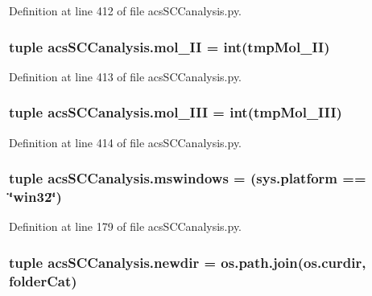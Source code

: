 Definition at line 412 of file acs\-S\-C\-Canalysis.\-py.

\hypertarget{a00096_a8f2878f5909e4aeb9155a1103eaba413}{
\subsubsection[{mol\-\_\-\-I\-I}]{\setlength{\rightskip}{0pt plus 5cm}tuple acs\-S\-C\-Canalysis.\-mol\-\_\-\-I\-I = int(tmp\-Mol\-\_\-\-I\-I)}}\label{a00096_a8f2878f5909e4aeb9155a1103eaba413}


Definition at line 413 of file acs\-S\-C\-Canalysis.\-py.

\hypertarget{a00096_a20047e8516f386a7e98ffa0efec09471}{
\subsubsection[{mol\-\_\-\-I\-I\-I}]{\setlength{\rightskip}{0pt plus 5cm}tuple acs\-S\-C\-Canalysis.\-mol\-\_\-\-I\-I\-I = int(tmp\-Mol\-\_\-\-I\-I\-I)}}\label{a00096_a20047e8516f386a7e98ffa0efec09471}


Definition at line 414 of file acs\-S\-C\-Canalysis.\-py.

\hypertarget{a00096_a2abf09620dd1dd990036c67c626b3dee}{
\subsubsection[{mswindows}]{\setlength{\rightskip}{0pt plus 5cm}tuple acs\-S\-C\-Canalysis.\-mswindows = (sys.\-platform == \char`\"{}win32\char`\"{})}}\label{a00096_a2abf09620dd1dd990036c67c626b3dee}


Definition at line 179 of file acs\-S\-C\-Canalysis.\-py.

\hypertarget{a00096_a440179ca1c764cabcf9181985ae5dfb8}{
\subsubsection[{newdir}]{\setlength{\rightskip}{0pt plus 5cm}tuple acs\-S\-C\-Canalysis.\-newdir = os.\-path.\-join(os.\-curdir, {\bf folder\-Cat})}}\label{a00096_a440179ca1c764cabcf9181985ae5dfb8}


